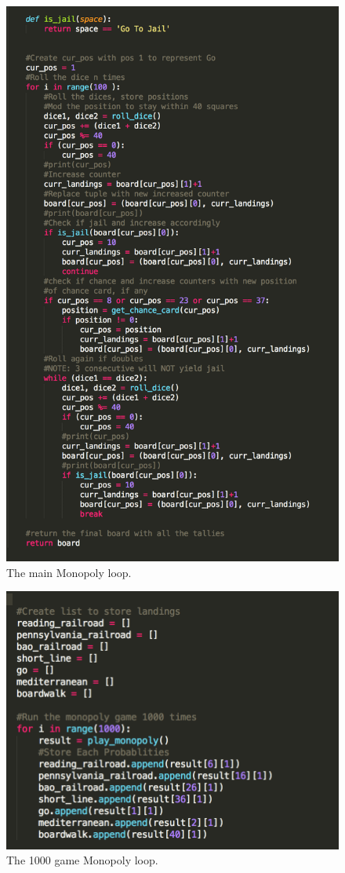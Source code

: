 \documentclass[12pt, letter]{article}
\begin{document}
 \begin{figure}[htb]
  \centering
  \includegraphics[width=0.7 \textwidth]{./figures/monopoly_loop.png}
  \caption{The main Monopoly loop.}
\end{figure}

 \begin{figure}[htb]
  \centering
  \includegraphics[width=0.7 \textwidth]{./figures/monopoly_probs.png}
  \caption{The 1000 game Monopoly loop.}
\end{figure}
\end{document}
